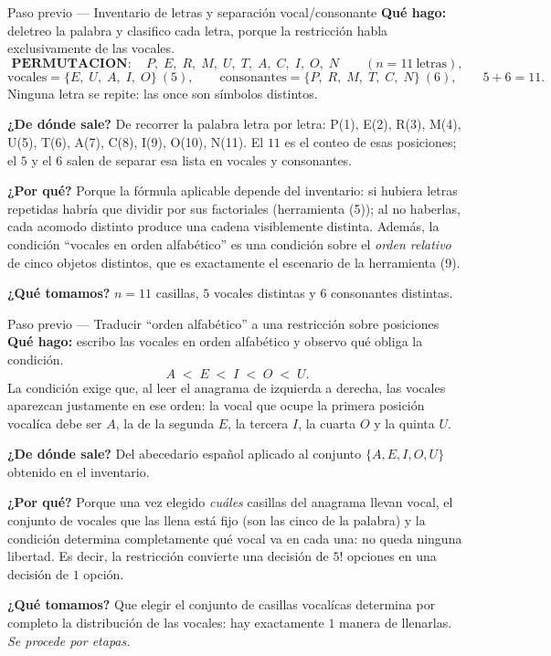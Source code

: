 \documentclass[11pt]{article}
\begin{document}
\begin{paso}{Paso previo --- Inventario de letras y separaci\'on vocal/consonante}
\textbf{Qu\'e hago:} deletreo la palabra y clasifico cada letra, porque la restricci\'on habla
exclusivamente de las vocales.
\[
\textbf{PERMUTACION}:\quad P,\;E,\;R,\;M,\;U,\;T,\;A,\;C,\;I,\;O,\;N \qquad (n=11\ \text{letras}),
\]
\[
\text{vocales}=\{E,\;U,\;A,\;I,\;O\}\ (5),\qquad
\text{consonantes}=\{P,\;R,\;M,\;T,\;C,\;N\}\ (6),\qquad 5+6=11 .
\]
Ninguna letra se repite: las once son s\'imbolos distintos.

\textbf{¿De d\'onde sale?} De recorrer la palabra letra por letra: P(1), E(2), R(3), M(4), U(5), T(6), A(7),
C(8), I(9), O(10), N(11). El $11$ es el conteo de esas posiciones; el $5$ y el $6$ salen de separar esa
lista en vocales y consonantes.

\textbf{¿Por qu\'e?} Porque la f\'ormula aplicable depende del inventario: si hubiera letras repetidas
habr\'ia que dividir por sus factoriales (herramienta (5)); al no haberlas, cada acomodo distinto produce
una cadena visiblemente distinta. Adem\'as, la condici\'on ``vocales en orden alfab\'etico'' es una
condici\'on sobre el \emph{orden relativo} de cinco objetos distintos, que es exactamente el escenario de la
herramienta (9).

\textbf{¿Qu\'e tomamos?} $n=11$ casillas, $5$ vocales distintas y $6$ consonantes distintas.
\end{paso}

\begin{paso}{Paso previo --- Traducir ``orden alfab\'etico'' a una restricci\'on sobre posiciones}
\textbf{Qu\'e hago:} escribo las vocales en orden alfab\'etico y observo qu\'e obliga la condici\'on.
\[
A\;<\;E\;<\;I\;<\;O\;<\;U .
\]
La condici\'on exige que, al leer el anagrama de izquierda a derecha, las vocales aparezcan justamente en ese
orden: la vocal que ocupe la primera posici\'on vocal\'ica debe ser $A$, la de la segunda $E$, la tercera
$I$, la cuarta $O$ y la quinta $U$.

\textbf{¿De d\'onde sale?} Del abecedario espa\~nol aplicado al conjunto $\{A,E,I,O,U\}$ obtenido en el
inventario.

\textbf{¿Por qu\'e?} Porque una vez elegido \emph{cu\'ales} casillas del anagrama llevan vocal, el conjunto
de vocales que las llena est\'a fijo (son las cinco de la palabra) y la condici\'on determina completamente
qu\'e vocal va en cada una: no queda ninguna libertad. Es decir, la restricci\'on convierte una decisi\'on de
$5!$ opciones en una decisi\'on de $1$ opci\'on.

\textbf{¿Qu\'e tomamos?} Que elegir el conjunto de casillas vocal\'icas determina por completo la
distribuci\'on de las vocales: hay exactamente $1$ manera de llenarlas. \emph{Se procede por etapas.}
\end{paso}
\end{document}
